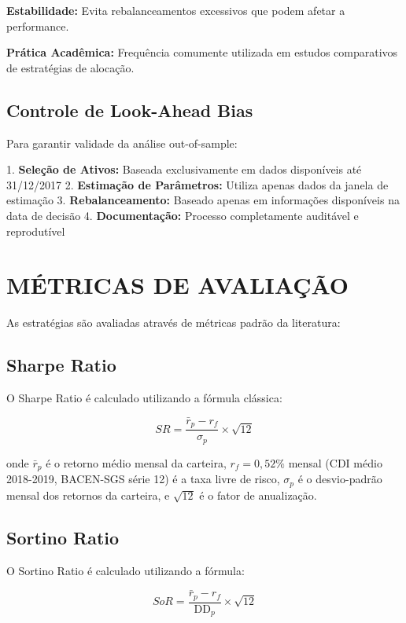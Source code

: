 \textbf{Estabilidade:} Evita rebalanceamentos excessivos que podem afetar a performance.

\textbf{Prática Acadêmica:} Frequência comumente utilizada em estudos comparativos de estratégias de alocação.

\subsection{Controle de Look-Ahead Bias}

Para garantir validade da análise out-of-sample:

1. \textbf{Seleção de Ativos:} Baseada exclusivamente em dados disponíveis até 31/12/2017
2. \textbf{Estimação de Parâmetros:} Utiliza apenas dados da janela de estimação
3. \textbf{Rebalanceamento:} Baseado apenas em informações disponíveis na data de decisão
4. \textbf{Documentação:} Processo completamente auditável e reprodutível

\section{MÉTRICAS DE AVALIAÇÃO}

As estratégias são avaliadas através de métricas padrão da literatura:

\subsection{Sharpe Ratio}

O Sharpe Ratio é calculado utilizando a fórmula clássica:

\begin{equation}
SR = \frac{\bar{r}_p - r_f}{\sigma_p} \times \sqrt{12}
\end{equation}

onde $\bar{r}_p$ é o retorno médio mensal da carteira, $r_f = 0,52\%$ mensal (CDI médio 2018-2019, BACEN-SGS série 12) é a taxa livre de risco, $\sigma_p$ é o desvio-padrão mensal dos retornos da carteira, e $\sqrt{12}$ é o fator de anualização.

\subsection{Sortino Ratio}

O Sortino Ratio é calculado utilizando a fórmula:

\begin{equation}
SoR = \frac{\bar{r}_p - r_f}{\text{DD}_p} \times \sqrt{12}
\end{equation}

